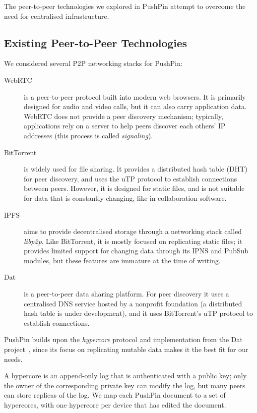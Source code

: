 \documentclass[sigplan,10pt]{acmart}
\begin{document}
The peer-to-peer technologies we explored in PushPin attempt to overcome the need for centralised infrastructure.

\subsection{Existing Peer-to-Peer Technologies}\label{sec:existing-p2p}

We considered several P2P networking stacks for PushPin:
\begin{description}
\item[WebRTC] is a peer-to-peer protocol built into modern web browsers.
It is primarily designed for audio and video calls, but it can also carry application data.
WebRTC does not provide a peer discovery mechanism; typically, applications rely on a server to help peers discover each others' IP addresses (this process is called \emph{signaling}).
\item[BitTorrent] is widely used for file sharing.
It provides a distributed hash table (DHT) for peer discovery, and uses the uTP protocol to establish connections between peers.
However, it is designed for static files, and is not suitable for data that is constantly changing, like in collaboration software.
\item[IPFS] aims to provide decentralised storage through a networking stack called \emph{libp2p}.
Like BitTorrent, it is mostly focused on replicating static files; it provides limited support for changing data through its IPNS and PubSub modules, but these features are immature at the time of writing.
\item[Dat] \cite{HowDatWorks,Ogden:2018ur} is a peer-to-peer data sharing platform.
For peer discovery it uses a centralised DNS service hosted by a nonprofit foundation (a distributed hash table is under development), and it uses BitTorrent's uTP protocol to establish connections.
\end{description}

PushPin builds upon the \emph{hypercore} protocol and implementation from the Dat project~\cite{HowDatWorks}, since its focus on replicating mutable data makes it the best fit for our needs.

A hypercore is an append-only log that is authenticated with a public key; only the owner of the corresponding private key can modify the log, but many peers can store replicas of the log.
We map each PushPin document to a set of hypercores, with one hypercore per device that has edited the document.
\end{document}
